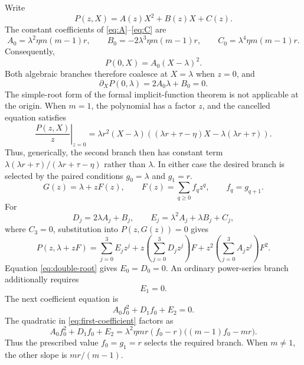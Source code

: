 \documentclass[11pt]{article}
\theoremstyle{remark}
\begin{document}
Write
\[
 P(z,X)=A(z)X^2+B(z)X+C(z).
\]
The constant coefficients of \eqref{eq:A}--\eqref{eq:C} are
\[
 A_0=\lambda^2\eta m(m-1)r,\qquad
 B_0=-2\lambda^3\eta m(m-1)r,\qquad
 C_0=\lambda^4\eta m(m-1)r.
\]
Consequently,
\begin{equation}
 P(0,X)=A_0(X-\lambda)^2.
 \label{eq:double-root}
\end{equation}
Both algebraic branches therefore coalesce at $X=\lambda$ when $z=0$, and
\begin{equation}
 \partial_XP(0,\lambda)=2A_0\lambda+B_0=0.
 \label{eq:vanishing-derivative}
\end{equation}
The simple-root form of the formal implicit-function theorem is not
applicable at the origin.  When $m=1$, the polynomial has a factor $z$, and
the cancelled equation satisfies
\[
 \left.\frac{P(z,X)}z\right|_{z=0}
 =\lambda r^2(X-\lambda)
  ((\lambda r+\tau-\eta)X-\lambda(\lambda r+\tau)).
\]
Thus, generically, the second branch then has constant term
$\lambda(\lambda r+\tau)/(\lambda r+\tau-\eta)$ rather than
$\lambda$.  In either case the desired branch is selected by the paired
conditions $g_0=\lambda$ and $g_1=r$.  \begin{equation}
 G(z)=\lambda+zF(z),\qquad
 F(z)=\sum_{q\geq0}f_qz^q,\qquad f_q=g_{q+1}.
 \label{eq:desingularization}
\end{equation}
For
\[
 D_j=2\lambda A_j+B_j,\qquad
 E_j=\lambda^2A_j+\lambda B_j+C_j,
\]
where $C_3=0$, substitution into $P(z,G(z))=0$ gives
\[
 P(z,\lambda+zF)=\sum_{j=0}^3E_jz^j
 +z\left(\sum_{j=0}^3D_jz^j\right)F
 +z^2\left(\sum_{j=0}^3A_jz^j\right)F^2.
\]
Equation \eqref{eq:double-root} gives $E_0=D_0=0$.  An ordinary power-series
branch additionally requires
\begin{equation}
 E_1=0.
 \label{eq:compatibility}
\end{equation}
The next coefficient equation is
\begin{equation}
 A_0f_0^2+D_1f_0+E_2=0.
 \label{eq:first-coefficient}
\end{equation}
The quadratic in \eqref{eq:first-coefficient} factors as
\begin{equation}
 A_0f_0^2+D_1f_0+E_2
 =\lambda^2\eta mr(f_0-r)\bigl((m-1)f_0-mr\bigr).
 \label{eq:first-coefficient-factorization}
\end{equation}
Thus the prescribed value $f_0=g_1=r$ selects the required branch.  When
$m\ne1$, the other slope is $mr/(m-1)$.
\end{document}
